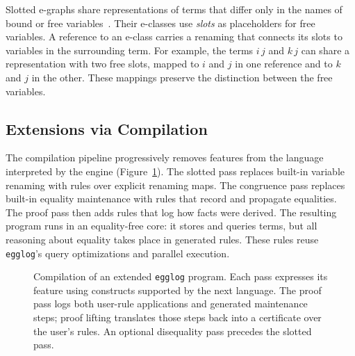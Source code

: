 Slotted e-graphs share representations of terms that differ only
  in the names of bound or free variables~\cite{slotted-egraphs}.
Their e-classes use \emph{slots} as placeholders for free variables.
A reference to an e-class carries a renaming that connects its slots
  to variables in the surrounding term.
For example, the terms $i\,j$ and $k\,j$ can share a representation with two free slots,
  mapped to $i$ and $j$ in one reference and to $k$ and $j$ in the other.
These mappings preserve the distinction between the free variables.

\subsection{Extensions via Compilation}
\label{sec:extension-architecture}

The compilation pipeline progressively removes features from the language
  interpreted by the engine (Figure~\ref{fig:extension-pipeline}).
The slotted pass replaces built-in variable renaming with rules over explicit renaming maps.
The congruence pass replaces built-in equality maintenance with rules that record
  and propagate equalities.
The proof pass then adds rules that log how facts were derived.
The resulting program runs in an equality-free core:
  it stores and queries terms, but all reasoning about equality takes place in generated rules.
These rules reuse \texttt{egglog}'s query optimizations and parallel execution.

\begin{figure}[htbp]
  \centering
  
  \caption{Compilation of an extended \texttt{egglog} program.
    Each pass expresses its feature using constructs supported by the next language.
    The proof pass logs both user-rule applications and generated maintenance steps;
    proof lifting translates those steps back into a certificate over the user's rules.
    An optional disequality pass precedes the slotted pass.}
  \label{fig:extension-pipeline}
\end{figure}


